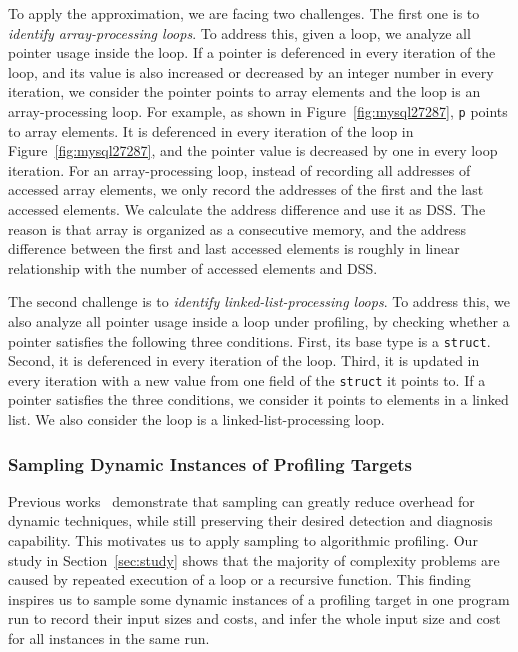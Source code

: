 {{To apply the approximation, we are facing two challenges. 
The first one is to \emph{identify array-processing loops}.
To address this, given a loop, we analyze all pointer usage inside the loop. 
If a pointer is deferenced in every iteration of the loop, 
and its value is also increased or decreased by 
an integer number in every iteration,
we consider the pointer points to array elements and 
the loop is an array-processing loop.  
For example, as shown in Figure~\ref{fig:mysql27287}, 
\texttt{p} points to array elements. 
It is deferenced in every iteration of the loop 
in Figure~\ref{fig:mysql27287},
and the pointer value is decreased by one in every loop iteration. 
For an array-processing loop, 
instead of recording all addresses of 
accessed array elements,
we only record the addresses 
of the first and the last accessed elements. 
We calculate the address difference and use it as DSS.
The reason is that array is organized as a 
consecutive memory, and the address difference 
between the first and last accessed elements is roughly in linear 
relationship with the number of accessed elements and DSS. 




The second challenge is to \emph{identify linked-list-processing loops}.
To address this, we also analyze all pointer usage inside a loop under profiling, 
by checking whether a pointer satisfies the following three conditions.
First, its base type is a \texttt{struct}.
Second, it is deferenced in every iteration of the loop.
Third, it is updated in every iteration with a new value 
from one field of the \texttt{struct} it points to.
If a pointer satisfies the three conditions, 
we consider it points to elements in a linked list.
We also consider the loop is a linked-list-processing loop. 



\subsubsection{Sampling Dynamic Instances of Profiling Targets}


Previous works~\cite{liblit03,liblit05,CCI,SongOOPSLA2014,ldoctor}
demonstrate that sampling can greatly 
reduce overhead for dynamic techniques,
while still preserving their desired 
detection and diagnosis capability. 
This motivates us to apply sampling to algorithmic profiling. 
Our study in Section~\ref{sec:study} shows that 
the majority of complexity problems are caused by repeated execution of a loop
or a recursive function. 
This finding inspires us to sample some dynamic instances of 
a profiling target in one program run to 
record their input sizes and costs,
and infer the whole input size and cost for all instances in the same run.


}}
